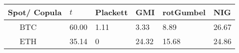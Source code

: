    {\begin{tabularx}{\textwidth}{lYYYYY} \toprule
         Spot/ Copula & $t$ & Plackett & GMI & rotGumbel & NIG \\ \midrule
        \ \ \ BTC          & 60.00          & 1.11              & 3.33                        & 8.89                  & 26.67                  \\
        \ \ \ ETH          & 35.14          & 0                 & 24.32                       & 15.68                 & 24.86                   \\
    \bottomrule
    \end{tabularx}
       }








